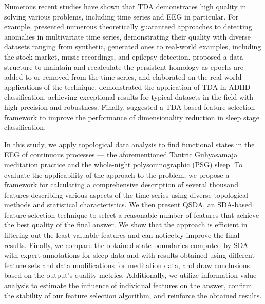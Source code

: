 \documentclass[journal,twoside,web]{ieeecolor2}
\begin{document}
Numerous recent studies have shown that TDA demonstrates high quality in solving various problems, including time series and EEG in particular. For example, \cite{chazal2024topologicalanalysisdetectinganomalies,rai2024identifyingextremeeventsstock,heo2024persistenthomologyfeaturedtime,chrétien2024timetopologicalanalysiseeg} presented numerous theoretically guaranteed approaches to detecting anomalies in multivariate time series, demonstrating their quality with diverse datasets ranging from synthetic, generated ones to real-world examples, including the stock market, music recordings, and epilepsy detection. \cite{dimontesano2024dynamicallymaintainingpersistenthomology} proposed a data structure to maintain and recalculate the persistent homology as epochs are added to or removed from the time series, and \cite{ost2024bananatreespersistencetime} elaborated on the real-world applications of the technique.  \cite{cai2024topologicalfeaturesearchmethod} demonstrated the application of TDA in ADHD classification, achieving exceptional results for typical datasets in the field with high precision and robustness. Finally, \cite{deng2024twostagehierarchicalexplainablefeature} suggested a TDA-based feature selection framework to improve the performance of dimensionality reduction in sleep stage classification.

In this study, we apply topological data analysis to find functional states in the EEG of continuous processes --- the aforementioned Tantric Guhyasamaja meditation practice and the whole-night polysomnographic (PSG) sleep. To evaluate the applicability of the approach to the problem, we propose a framework for calculating a comprehensive description of several thousand features describing various aspects of the time series using diverse topological methods and statistical characteristics. We then present QSDA, an SDA-based feature selection technique to select a reasonable number of features that achieve the best quality of the final answer. We show that the approach is efficient in filtering out the least valuable features and can noticebly improve the final results. Finally, we compare the obtained state boundaries computed by SDA with expert annotations for sleep data and with results obtained using different feature sets and data modifications for meditation data, and draw conclusions based on the output's quality metrics. Additionally, we utilize information value analysis to estimate the influence of individual features on the answer, confirm the stability of our feature selection algorithm, and reinforce the obtained results.
\end{document}
